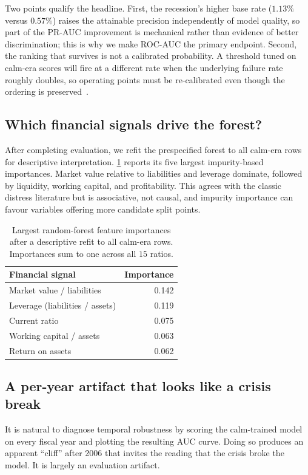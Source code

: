 \documentclass[manuscript,nonacm]{acmart}
\begin{document}
Two points qualify the headline. First, the recession's higher base rate ($1.13\%$
versus $0.57\%$) raises the attainable precision independently of model quality, so part
of the PR-AUC improvement is mechanical rather than evidence of better discrimination;
this is why we make ROC-AUC the primary endpoint. Second, the ranking that survives is
not a calibrated probability. A threshold tuned on calm-era scores will fire at a
different rate when the underlying failure rate roughly doubles, so operating points
must be re-calibrated even though the ordering is preserved~\cite{vancalster2019}.

\subsection{Which financial signals drive the forest?}
After completing evaluation, we refit the prespecified forest to all calm-era rows for
descriptive interpretation. \cref{tab:importance} reports its five largest
impurity-based importances. Market value relative to liabilities and leverage dominate,
followed by liquidity, working capital, and profitability. This agrees with the classic
distress literature but is associative, not causal, and impurity importance can favour
variables offering more candidate split points.

\begin{table}[t]
\centering
\caption{Largest random-forest feature importances after a descriptive refit to all
calm-era rows. Importances sum to one across all $15$ ratios.}
\label{tab:importance}
\begin{tabular}{lr}
\toprule
Financial signal & Importance\\
\midrule
Market value / liabilities & 0.142\\
Leverage (liabilities / assets) & 0.119\\
Current ratio & 0.075\\
Working capital / assets & 0.063\\
Return on assets & 0.062\\
\bottomrule
\end{tabular}
\end{table}

\subsection{A per-year artifact that looks like a crisis break}
\label{sec:artifact}
It is natural to diagnose temporal robustness by scoring the calm-trained model on every
fiscal year and plotting the resulting AUC curve. Doing so produces an apparent
``cliff'' after 2006 that invites the reading that the crisis broke the model. It is
largely an evaluation artifact.
\end{document}
